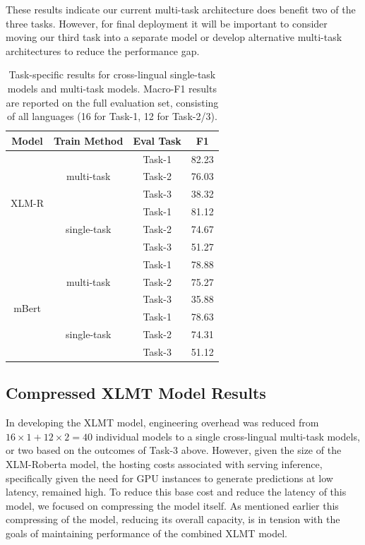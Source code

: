 These results indicate our current multi-task architecture does benefit two of the three tasks. 
However, for final deployment it will be important to consider moving our third task into a separate model or develop alternative multi-task architectures to reduce the performance gap.

\begin{table}[h]
\centering
\begin{tabular}{c|ccc}
    \hline
    \textbf{Model} & \textbf{Train Method} & \textbf{Eval Task} & \textbf{F1} \\
    \hline
    \multirow{6}{*}{XLM-R} & \multirow{3}{*}{multi-task}& Task-1 & 82.23 \\
     &  & Task-2 & 76.03 \\
     &  & Task-3 & 38.32 \\
     \cline{2-4}
     & \multirow{3}{*}{single-task} & Task-1 & 81.12 \\
     &  & Task-2 & 74.67 \\
     &  & Task-3 & 51.27 \\
    \hline
    \multirow{6}{*}{mBert} &  \multirow{3}{*}{multi-task} & Task-1 & 78.88 \\
     &  & Task-2 & 75.27 \\
     &  & Task-3 & 35.88 \\
     \cline{2-4}
     &  \multirow{3}{*}{single-task} & Task-1 & 78.63 \\
     &  & Task-2 & 74.31 \\
     &  & Task-3 & 51.12 \\
    \hline
\end{tabular}
\caption{Task-specific results for cross-lingual single-task models and multi-task models. Macro-F1 results are reported on the full evaluation set, consisting of all languages (16 for Task-1, 12 for Task-2/3).}
\label{table:tasks}
\end{table}


\subsection{Compressed XLMT Model Results}
In developing the XLMT model, engineering overhead was reduced from $16 \times 1 + 12 \times 2 = 40$ individual models to a single cross-lingual multi-task models, or two based on the outcomes of Task-3 above.
However, given the size of the XLM-Roberta model, the hosting costs associated with serving inference, specifically given the need for GPU instances to generate predictions at low latency, remained high.
To reduce this base cost and reduce the latency of this model, we focused on compressing the model itself.
As mentioned earlier this compressing of the model, reducing its overall capacity, is in tension with the goals of maintaining performance of the combined XLMT model.

